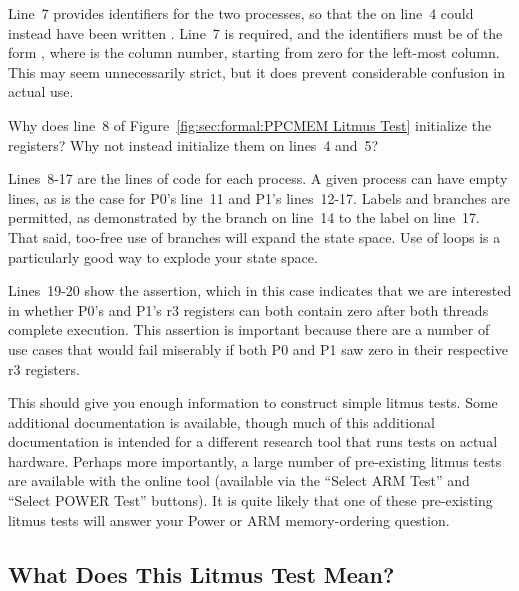 Line~7 provides identifiers for the two processes, so that the 
on line~4 could instead have been written . Line~7 is
required, and the identifiers must be of the form , where 
is the column number, starting from zero for the left-most column. This
may seem unnecessarily strict, but it does prevent considerable confusion
in actual use.

\QuickQuiz{}
	Why does line~8
	of Figure~\ref{fig:sec:formal:PPCMEM Litmus Test}
	initialize the registers?
	Why not instead initialize them on lines~4 and~5?
 \QuickQuizEnd

Lines~8-17 are the lines of code for each process. A given process
can have empty lines, as is the case for P0's line~11 and P1's
lines~12-17.
Labels and branches are permitted, as demonstrated by the branch
on line~14 to the label on line~17. That said, too-free use of branches
will expand the state space. Use of loops is a particularly good way to
explode your state space.

Lines~19-20 show the assertion, which in this case indicates that we
are interested in whether P0's and P1's r3 registers can both contain
zero after both threads complete execution. This assertion is important
because there are a number of use cases that would fail miserably if
both P0 and P1 saw zero in their respective r3 registers.

This should give you enough information to construct simple litmus
tests. Some additional documentation is available, though much of this
additional documentation is intended for a different research tool that
runs tests on actual hardware. Perhaps more importantly, a large number of
pre-existing litmus tests are available with the online tool (available
via the ``Select ARM Test'' and ``Select POWER Test'' buttons). It is
quite likely that one of these pre-existing litmus tests will answer
your Power or ARM memory-ordering question.

\subsection{What Does This Litmus Test Mean?}
\label{sec:formal:What Does This Litmus Test Mean?}

